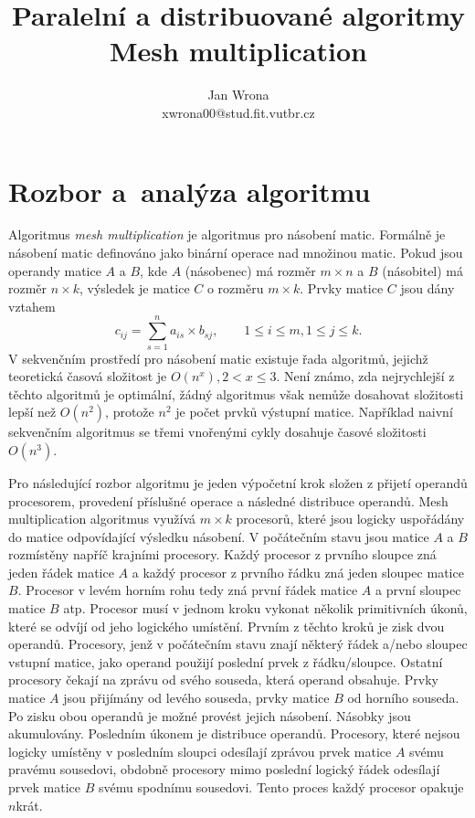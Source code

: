 \documentclass[a4paper, 12pt]{article}[24.4.2015]
\title{Paralelní a distribuované algoritmy\\Mesh multiplication}
\author{Jan Wrona\\xwrona00@stud.fit.vutbr.cz}
\date{}
\begin{document}
\maketitle

\section{Rozbor a~analýza algoritmu} \label{analysis}
Algoritmus \emph{mesh multiplication} je algoritmus pro násobení matic. Formálně je násobení matic definováno jako binární operace nad množinou matic. Pokud jsou operandy matice \(A\) a \(B\), kde \(A\) (násobenec) má rozměr \(m \times n\) a \(B\) (násobitel) má rozměr \(n \times k\), výsledek je matice \(C\) o rozměru \(m \times k\). Prvky matice \(C\) jsou dány vztahem
\begin{equation}\label{mat_mult}
c_{ij} = \sum_{s = 1}^{n} a_{is} \times b_{sj}, \qquad 1 \leq i \leq m, 1 \leq j \leq k.
\end{equation}
V sekvenčním prostředí pro násobení matic existuje řada algoritmů, jejichž teoretická časová složitost je \(O(n^x), 2 < x \leq 3\). Není známo, zda nejrychlejší z těchto algoritmů je optimální, žádný algoritmus však nemůže dosahovat složitosti lepší než \(O(n^2)\), protože \(n^2\) je počet prvků výstupní matice. Například naivní sekvenčním algoritmus se třemi vnořenými cykly dosahuje časové složitosti \(O(n^3)\).

Pro následující rozbor algoritmu je jeden výpočetní krok složen z přijetí operandů procesorem, provedení příslušné operace a následné distribuce operandů. Mesh multiplication algoritmus využívá \(m \times k\) procesorů, které jsou logicky uspořádány do matice odpovídající výsledku násobení. V počátečním stavu jsou matice \(A\) a \(B\) rozmístěny napříč krajními procesory. Každý procesor z prvního sloupce zná jeden řádek matice \(A\) a každý procesor z prvního řádku zná jeden sloupec matice \(B\). Procesor v levém horním rohu tedy zná první řádek matice \(A\) a první sloupec matice \(B\) atp. Procesor musí v jednom kroku vykonat několik primitivních úkonů, které se odvíjí od jeho logického umístění. Prvním z těchto kroků je zisk dvou operandů. Procesory, jenž v počátečním stavu znají některý řádek a/nebo sloupec vstupní matice, jako operand použijí poslední prvek z řádku/sloupce. Ostatní procesory čekají na zprávu od svého souseda, která operand obsahuje. Prvky matice \(A\) jsou přijímány od levého souseda, prvky matice \(B\) od horního souseda. Po zisku obou operandů je možné provést jejich násobení. Násobky jsou akumulovány. Posledním úkonem je distribuce operandů. Procesory, které nejsou logicky umístěny v posledním sloupci odesílají zprávou prvek matice \(A\) svému pravému sousedovi, obdobně procesory mimo poslední logický řádek odesílají prvek matice \(B\) svému spodnímu sousedovi. Tento proces každý procesor opakuje \(n\)krát.
\end{document}
